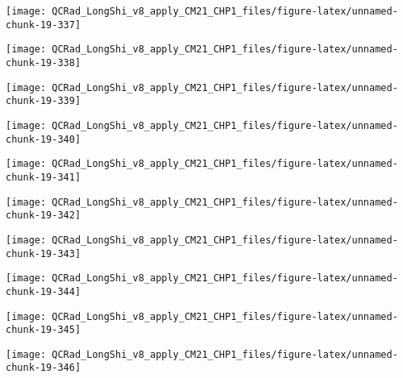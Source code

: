 \documentclass[
  10pt,
  a4paper,oneside]{article}
\begin{document}
\begin{center}\texttt{[image: QCRad\_LongShi\_v8\_apply\_CM21\_CHP1\_files/figure-latex/unnamed-chunk-19-337]} \end{center}

\begin{center}\texttt{[image: QCRad\_LongShi\_v8\_apply\_CM21\_CHP1\_files/figure-latex/unnamed-chunk-19-338]} \end{center}

\begin{center}\texttt{[image: QCRad\_LongShi\_v8\_apply\_CM21\_CHP1\_files/figure-latex/unnamed-chunk-19-339]} \end{center}

\begin{center}\texttt{[image: QCRad\_LongShi\_v8\_apply\_CM21\_CHP1\_files/figure-latex/unnamed-chunk-19-340]} \end{center}

\begin{center}\texttt{[image: QCRad\_LongShi\_v8\_apply\_CM21\_CHP1\_files/figure-latex/unnamed-chunk-19-341]} \end{center}

\begin{center}\texttt{[image: QCRad\_LongShi\_v8\_apply\_CM21\_CHP1\_files/figure-latex/unnamed-chunk-19-342]} \end{center}

\begin{center}\texttt{[image: QCRad\_LongShi\_v8\_apply\_CM21\_CHP1\_files/figure-latex/unnamed-chunk-19-343]} \end{center}

\begin{center}\texttt{[image: QCRad\_LongShi\_v8\_apply\_CM21\_CHP1\_files/figure-latex/unnamed-chunk-19-344]} \end{center}

\begin{center}\texttt{[image: QCRad\_LongShi\_v8\_apply\_CM21\_CHP1\_files/figure-latex/unnamed-chunk-19-345]} \end{center}

\begin{center}\texttt{[image: QCRad\_LongShi\_v8\_apply\_CM21\_CHP1\_files/figure-latex/unnamed-chunk-19-346]} \end{center}
\end{document}
